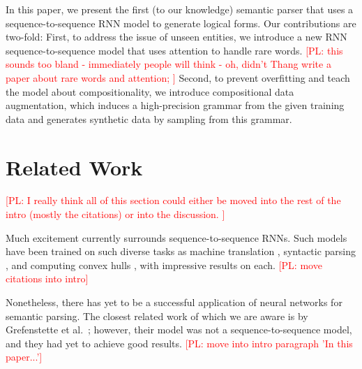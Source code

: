 \documentclass[11pt,letterpaper]{article}
\newcommand\pl[1]{\textcolor{red}{[PL: #1]}}
\begin{document}
In this paper, we present the first (to our knowledge)
semantic parser that uses a sequence-to-sequence RNN model to generate
logical forms.  
Our contributions are two-fold:
First, to address the issue of unseen entities,
we introduce a new RNN sequence-to-sequence model that uses 
attention to handle rare words.
\pl{this sounds too bland - immediately people will think - oh, didn't Thang
  write a paper about rare words and attention;
}
Second, to prevent overfitting and teach the model about compositionality,
we introduce compositional data augmentation,
which induces a high-precision grammar from the given training data
and generates synthetic data by sampling from this grammar.



\section{Related Work}

\pl{I really think all of this section could either be moved into the rest of
  the intro (mostly the citations)
  or into the discussion.
}

Much excitement currently surrounds sequence-to-sequence RNNs.
Such models have been trained on such diverse tasks as
machine translation \cite{sutskever2014sequence,bahdanau2014neural}, 
syntactic parsing \cite{vinyals2015grammar}, and 
computing convex hulls \cite{vinyals2015pointer}, 
with impressive results on each.
\pl{move citations into intro}

Nonetheless, there has yet to be a successful application of
neural networks for semantic parsing.
The closest related work of which we are aware is
by Grefenstette et al.~;
however, their model was not a sequence-to-sequence model,
and they had yet to achieve good results.
\pl{move into intro paragraph 'In this paper...'}
\end{document}
